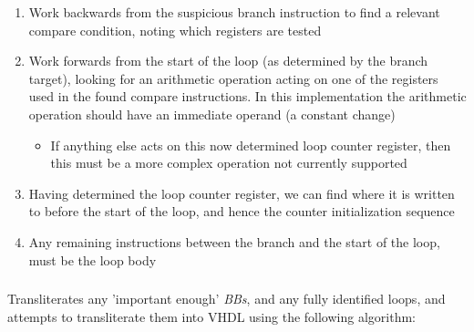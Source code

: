 \documentclass[a4paper]{article}
\begin{document}
\begin{enumerate}
  \item Work backwards from the suspicious branch instruction to find a relevant compare condition, noting which registers are tested
  \item Work forwards from the start of the loop (as determined by the branch target), looking for an arithmetic operation acting on one of the registers used in the found compare instructions. In this implementation the arithmetic operation should have an immediate operand (a constant change)
    \begin{itemize}
      \item If anything else acts on this now determined loop counter register, then this must be a more complex operation not currently supported
    \end{itemize}
  \item Having determined the loop counter register, we can find where it is written to before the start of the loop, and hence the counter initialization sequence
  \item Any remaining instructions between the branch and the start of the loop, must be the loop body
\end{enumerate}

\subsubsection{}

Transliterates any 'important enough' \emph{BBs}, and any fully identified loops, and attempts to transliterate them into VHDL using the following algorithm:
\end{document}
